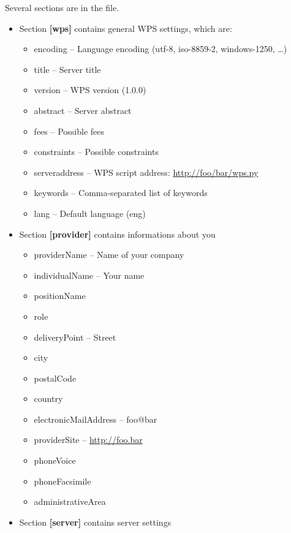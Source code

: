 \documentclass[a4paper,11pt]{article}
\begin{document}
Several sections are in the file. 
\begin{itemize}
    \item Section \textbf{[wps]} contains general WPS settings, which are:
        \begin{itemize}
            \item encoding -- Language encoding (utf-8, iso-8859-2, windows-1250, \dots)
            \item title -- Server title 
            \item version -- WPS version (1.0.0)
            \item abstract -- Server abstract
            \item fees -- Possible fees
            \item constraints -- Possible constraints
            \item serveraddress -- WPS script address: \url{http://foo/bar/wps.py}
            \item keywords -- Comma-separated list of keywords
            \item lang -- Default language (eng)
        \end{itemize}
    \item Section \textbf{[provider]} contains informations about you
        \begin{itemize}
            \item providerName -- Name of your company
            \item individualName -- Your name
            \item positionName
            \item role 
            \item deliveryPoint -- Street
            \item city
            \item postalCode
            \item country
            \item electronicMailAddress -- foo@bar
            \item providerSite -- \url{http://foo.bar}
            \item phoneVoice
            \item phoneFacsimile
            \item administrativeArea
        \end{itemize}
    \item Section \textbf{[server]} contains server settings
        \begin{itemize}

\end{itemize}
\end{itemize}
\end{document}
